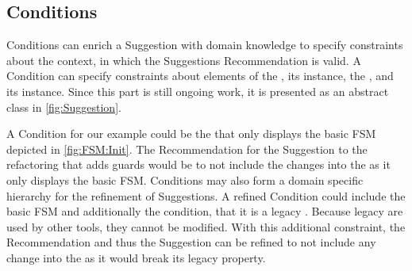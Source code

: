 \subsection{Conditions}
\label{sec:Conditions}

\textsf{Condition}s can enrich a \textsf{Suggestion} with domain knowledge to 
specify constraints about the context, in which the \textsf{Suggestion}s 
\textsf{Recommendation} is valid. A \textsf{Condition} can specify constraints 
about elements of the \metamodel, its instance, the \viewtype \metamodel, and 
its instance. 
Since this part is still ongoing work, it is presented as an abstract class 
in \autoref{fig:Suggestion}.

A \textsf{Condition} for our example could be the \viewtype that 
only displays the basic \textsf{FSM} depicted in \cref{fig:FSM:Init}. 
The \textsf{Recommendation} for the \textsf{Suggestion} to the refactoring that 
adds guards would be to not include the \metamodel changes into the \viewtype as
it only displays the basic \textsf{FSM}. \textsf{Conditions} may also form a 
domain specific hierarchy for the refinement of \textsf{Suggestion}s. A refined 
\textsf{Condition} could include the basic \textsf{FSM} \viewtype and additionally
the condition, that it is a legacy \viewtype. Because legacy \viewtypes are used
by other tools, they cannot be modified. With this additional constraint, the 
\textsf{Recommendation} and thus the \textsf{Suggestion} can be refined to not 
include any \metamodel change into the \viewtype as it would break its legacy 
property.
